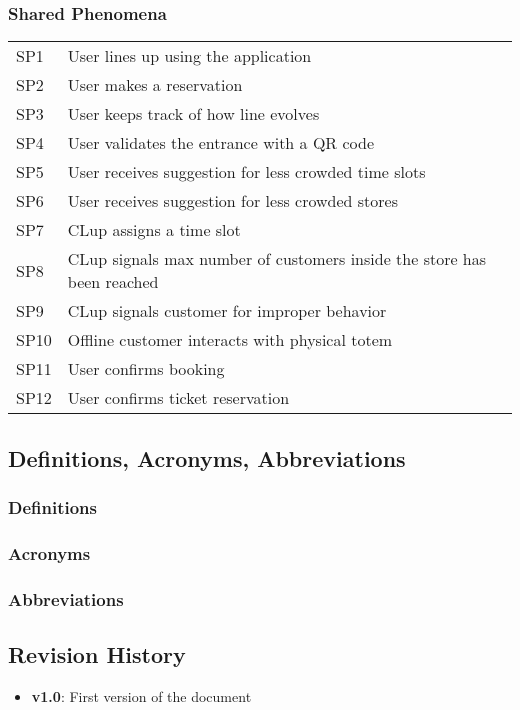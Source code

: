 \subsubsection{Shared Phenomena}
\begin{tabular}{l|l}
	SP1 & User lines up using the application \\
	SP2 & User makes a reservation \\
	SP3 & User keeps track of how line evolves \\
	SP4 & User validates the entrance with a QR code \\
	SP5 & User receives suggestion for less crowded time slots \\
	SP6 & User receives suggestion for less crowded stores \\
	SP7 & CLup assigns a time slot \\
	SP8 & CLup signals max number of customers inside the store has been reached \\
	SP9 & CLup signals customer for improper behavior \\
	SP10 & Offline customer interacts with physical totem \\
	SP11 & User confirms booking \\
	SP12 & User confirms ticket reservation \\
	
\end{tabular}

\subsection{Definitions, Acronyms, Abbreviations}

\subsubsection{Definitions}

\subsubsection{Acronyms}

\subsubsection{Abbreviations}


\subsection{Revision History}
\begin{itemize}
	\item
	\textbf{v1.0}: First version of the document
\end{itemize}


